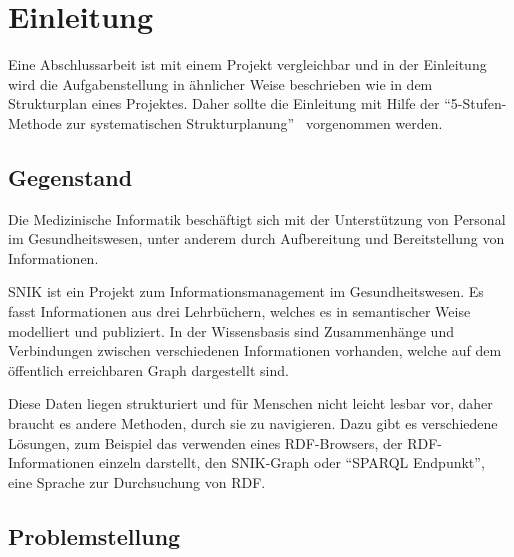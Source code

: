 \chapter{Einleitung}\label{ch:introduction}
Eine Abschlussarbeit ist mit einem Projekt vergleichbar und in der Einleitung wird die Aufgabenstellung in ähnlicher Weise beschrieben wie in dem Strukturplan eines Projektes.
Daher sollte die Einleitung mit Hilfe der \enquote{5-Stufen-Methode zur systematischen Strukturplanung}~\citep{ob}\footnotemark{} vorgenommen werden.

\section{Gegenstand}
Die Medizinische Informatik beschäftigt sich mit der Unterstützung von Personal im Gesundheitswesen, unter anderem durch Aufbereitung und Bereitstellung von Informationen.

SNIK ist ein Projekt zum Informationsmanagement im Gesundheitswesen.
Es fasst Informationen aus drei Lehrbüchern, welches es in semantischer Weise modelliert und publiziert.
In der Wissensbasis sind Zusammenhänge und Verbindungen zwischen verschiedenen Informationen vorhanden, welche auf dem öffentlich erreichbaren Graph dargestellt sind.

Diese Daten liegen strukturiert und für Menschen nicht leicht lesbar vor, daher braucht es andere Methoden, durch sie zu navigieren.
Dazu gibt es verschiedene Lösungen, zum Beispiel das verwenden eines RDF-Browsers, der RDF-Informationen einzeln darstellt, den SNIK-Graph oder \enquote{SPARQL Endpunkt}, eine Sprache zur Durchsuchung von RDF.
\section{Problemstellung}


